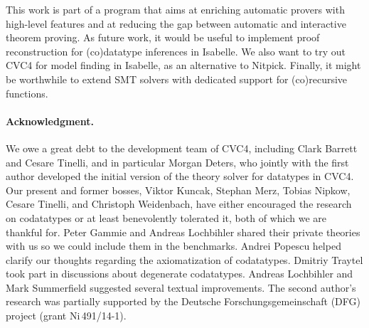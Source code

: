 This work is part of a program that aims at enriching automatic provers
with high-level features and at reducing the gap between automatic and
interactive theorem proving. As future work, it would be useful to implement
proof reconstruction for (co)data\-type inferences in Isabelle. We also
want to try out CVC4 for model finding in Isabelle, as an alternative to
Nitpick. Finally, it might be worthwhile to extend SMT solvers with dedicated
support for (co)recursive functions.


\def\ackname{Acknowledgment}
\paragraph{\ackname.}
We owe a great debt to the development team of CVC4, 
including Clark Barrett and Cesare Tinelli,
and in particular Morgan Deters,
who jointly with the first author developed the initial version 
of the theory solver for datatypes in CVC4.
%
Our present and former bosses, Viktor Kuncak, Stephan Merz, Tobias Nipkow,
Cesare Tinelli, and Christoph Weidenbach, have either encouraged the research on
codatatypes or at least benevolently tolerated it, both of which we are thankful
for.
%
Peter Gammie and Andreas Lochbihler shared their private
theories with us so we could include them in the benchmarks.
Andrei Popescu helped clarify our thoughts regarding the axiomatization of
codatatypes. Dmitriy Traytel took part in discussions about degenerate
codatatypes.
%
Andreas Lochbihler and Mark Summerfield suggested several textual improvements.
The second author's research was partially supported by the Deutsche
Forschungs\-gemein\-schaft (DFG) project
 (grant Ni\,491\slash 14-1).


{}


